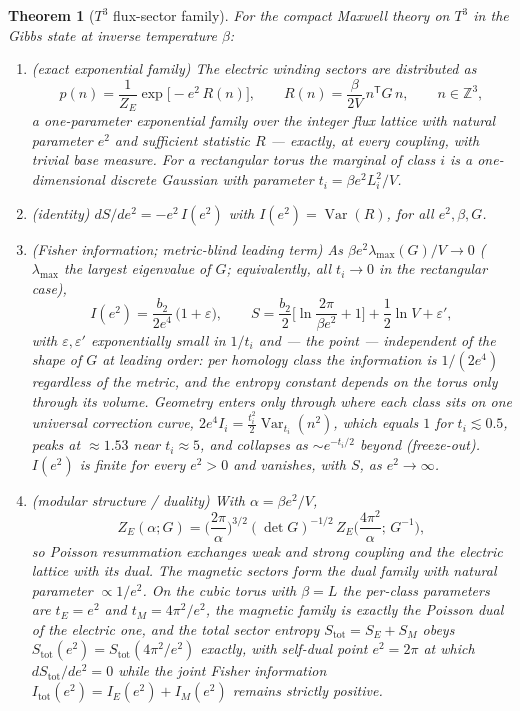 \documentclass[11pt]{article}
\newtheorem{theorem}{Theorem}
\theoremstyle{remark}
\theoremstyle{plain}
\newcommand{\Var}{\operatorname{Var}}
\newcommand{\Z}{\mathbb{Z}}
\begin{document}
\begin{theorem}[$T^3$ flux-sector family]\label{thm:t3}
For the compact Maxwell theory on $T^3$ in the Gibbs state at inverse temperature $\beta$:
\begin{enumerate}
\item[(a)] \emph{(exact exponential family)} The electric winding sectors are distributed as
\begin{equation}\label{eq:t3family}
p(n) = \frac{1}{Z_E} \exp\big[ -e^2\, R(n) \big], \qquad R(n) = \frac{\beta}{2V}\, n^{\mathsf T} G\, n, \qquad n \in \Z^{3},
\end{equation}
a one-parameter exponential family over the integer flux lattice with natural parameter $e^2$ and sufficient statistic $R$ --- exactly, at every coupling, with trivial base measure. For a rectangular torus the marginal of class $i$ is a one-dimensional discrete Gaussian with parameter $t_i = \beta e^2 L_i^2 / V$.
\item[(b)] \emph{(identity)} $dS/de^2 = -e^2\, I(e^2)$ with $I(e^2) = \Var(R)$, for all $e^2, \beta, G$.
\item[(c)] \emph{(Fisher information; metric-blind leading term)} As $\beta e^2 \lambda_{\max}(G)/V \to 0$ ($\lambda_{\max}$ the largest eigenvalue of $G$; equivalently, all $t_i \to 0$ in the rectangular case),
\[
I(e^2) = \frac{b_2}{2 e^4}\,\big(1 + \varepsilon\big), \qquad
S = \frac{b_2}{2}\Big[\ln\frac{2\pi}{\beta e^2} + 1\Big] + \frac12 \ln V + \varepsilon',
\]
with $\varepsilon, \varepsilon'$ exponentially small in $1/t_i$ and --- the point --- \emph{independent of the shape of $G$ at leading order}: per homology class the information is $1/(2e^4)$ regardless of the metric, and the entropy constant depends on the torus only through its volume. Geometry enters only through where each class sits on one universal correction curve, $2e^4 I_i = \tfrac{t_i^2}{2}\Var_{t_i}(n^2)$, which equals $1$ for $t_i \lesssim 0.5$, peaks at ${\approx}1.53$ near $t_i \approx 5$, and collapses as ${\sim}e^{-t_i/2}$ beyond (freeze-out). $I(e^2)$ is finite for every $e^2 > 0$ and vanishes, with $S$, as $e^2 \to \infty$.
\item[(d)] \emph{(modular structure / duality)} With $\alpha = \beta e^2 / V$,
\[
Z_E(\alpha; G) = \Big(\frac{2\pi}{\alpha}\Big)^{3/2} (\det G)^{-1/2}\, Z_E\Big(\frac{4\pi^2}{\alpha};\, G^{-1}\Big),
\]
so Poisson resummation exchanges weak and strong coupling and the electric lattice with its dual. The magnetic sectors form the dual family with natural parameter $\propto 1/e^2$. On the cubic torus with $\beta = L$ the per-class parameters are $t_E = e^2$ and $t_M = 4\pi^2/e^2$, the magnetic family is exactly the Poisson dual of the electric one, and the total sector entropy $S_{\mathrm{tot}} = S_E + S_M$ obeys $S_{\mathrm{tot}}(e^2) = S_{\mathrm{tot}}(4\pi^2/e^2)$ exactly, with self-dual point $e^2 = 2\pi$ at which $dS_{\mathrm{tot}}/de^2 = 0$ while the joint Fisher information $I_{\mathrm{tot}}(e^2) = I_E(e^2) + I_M(e^2)$ remains strictly positive.
\end{enumerate}
\end{theorem}
\end{document}
